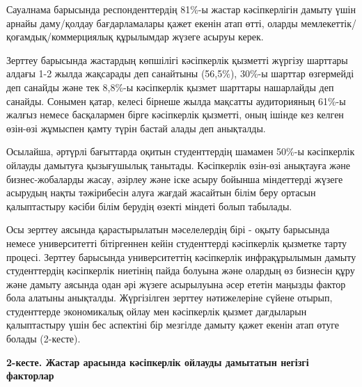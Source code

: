 \begin{multicols}{2}
Сауалнама барысында респонденттердің 81\%-ы жастар кәсіпкерлігін дамыту
үшін арнайы даму/қолдау бағдарламалары қажет екенін атап өтті, оларды
мемлекеттік/қоғамдық/коммерциялық құрылымдар жүзеге асыруы керек.

Зерттеу барысында жастардың көпшілігі кәсіпкерлік қызметті жүргізу
шарттары алдағы 1-2 жылда жақсарады деп санайтыны (56,5\%), 30\%-ы
шарттар өзгермейді деп санайды және тек 8,8\%-ы кәсіпкерлік қызмет
шарттары нашарлайды деп санайды. Сонымен қатар, келесі бірнеше жылда
мақсатты аудиторияның 61\%-ы жалғыз немесе басқалармен бірге кәсіпкерлік
қызметті, оның ішінде кез келген өзін-өзі жұмыспен қамту түрін бастай
алады деп анықталды.

Осылайша, әртүрлі бағыттарда оқитын студенттердің шамамен 50\%-ы
кәсіпкерлік ойлауды дамытуға қызығушылық танытады. Кәсіпкерлік өзін-өзі
анықтауға және бизнес-жобаларды жасау, әзірлеу және іске асыру бойынша
міндеттерді жүзеге асырудың нақты тәжірибесін алуға жағдай жасайтын
білім беру ортасын қалыптастыру кәсіби білім берудің өзекті міндеті
болып табылады.

Осы зерттеу аясында қарастырылатын мәселелердің бірі - оқыту барысында
немесе университетті бітіргеннен кейін студенттерді кәсіпкерлік қызметке
тарту процесі. Зерттеу барысында университеттің кәсіпкерлік
инфрақұрылымын дамыту студенттердің кәсіпкерлік ниетінің пайда болуына
және олардың өз бизнесін құру және дамыту аясында одан әрі жүзеге
асырылуына әсер ететін маңызды фактор бола алатыны анықталды.
Жүргізілген зерттеу нәтижелеріне сүйене отырып, студенттерде
экономикалық ойлау мен кәсіпкерлік қызмет дағдыларын қалыптастыру үшін
бес аспектіні бір мезгілде дамыту қажет екенін атап өтуге болады
(2-кесте).
\end{multicols}

{\bfseries 2-кесте. Жастар арасында кәсіпкерлік ойлауды дамытатын негізгі
факторлар}

